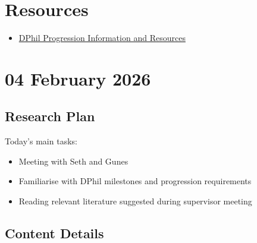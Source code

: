 \documentclass[12pt,a4paper,twoside]{article}
\begin{document}

\newpage
\tableofcontents
\newpage

\section{Resources}

\begin{itemize}
	\item \href{https://drive.google.com/drive/folders/1NMMUbx4KKj_sZhrTCWCkbRoOakGAddWG?usp=sharing}{DPhil Progression Information and Resources}
\end{itemize}
\newpage

\section{04 February 2026}

\subsection{Research Plan}
Today's main tasks:
\begin{itemize}[leftmargin=*]
	\item Meeting with Seth and Gunes
	\item Familiarise with DPhil milestones and progression requirements
	\item Reading relevant literature suggested during supervisor meeting

\end{itemize}

\subsection{Content Details}
\end{document}
